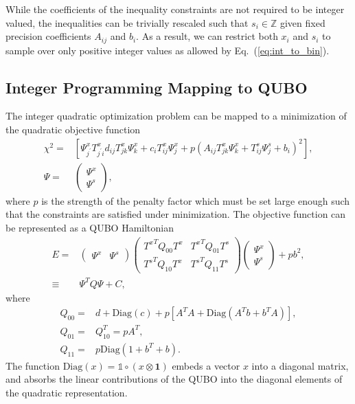 \documentclass[fleqn,10pt]{wlscirep}
\begin{document}
While the coefficients of the inequality constraints are not required to be integer valued, the inequalities can be trivially rescaled such that $s_i \in \mathbb{Z}$ given fixed precision coefficients $A_{ij}$ and $b_i$. As a result, we can restrict both $x_i$ and $s_i$ to sample over only positive integer values as allowed by Eq.~(\ref{eq:int_to_bin}).

\subsection{Integer Programming Mapping to QUBO}
\label{sec:results:ilp}
The integer quadratic optimization problem can be mapped to a minimization of the quadratic objective function
\begin{align}
\chi^2 = & \left[\Psi^x_{j^\prime} T^x_{j^\prime i}d_{ij} T^x_{jk}\Psi^x_k + c_i T^x_{ij} \Psi^x_j + p (A_{ij} T^x_{jk} \Psi^x_{k} + T^s_{ij} \Psi^s_j + b_i)^2 \right],\\
\Psi = & \begin{pmatrix}
\Psi^x\\
\Psi^s
\end{pmatrix},
\end{align}
where $p$ is the strength of the penalty factor which must be set large enough such that the constraints are satisfied under minimization. The objective function can be represented as a QUBO Hamiltonian
\begin{align}
E = &
\begin{pmatrix}
\Psi^x & \Psi^s
\end{pmatrix}
\begin{pmatrix}
{T^{x}}^T Q_{00} T^x & {T^{x}}^T Q_{01} T^s\\
{T^{s}}^T Q_{10} T^{x} & {T^{s}}^T Q_{11} T^s
\end{pmatrix}
\begin{pmatrix}
\Psi^x\\ \Psi^s
\end{pmatrix} + pb^2,\\
\equiv & \Psi^T Q \Psi + C,
\label{eq:matrix_form}
\end{align}
where
\begin{align}
Q_{00} = & d + \mathrm{Diag}(c) + p \left[ A^T A + \mathrm{Diag} \left(A^T b + b^T A\right)\right],\\
Q_{01} = & Q_{10}^T = pA^T,\\
Q_{11} = & p\mathrm{Diag}\left(1 + b^T + b\right).
\end{align}
The function $\mathrm{Diag}(x) = \mathds{1}\circ(x\otimes\mathbf{1})$ embeds a vector $x$ into a diagonal matrix, and absorbs the linear contributions of the QUBO into the diagonal elements of the quadratic representation.
\end{document}
